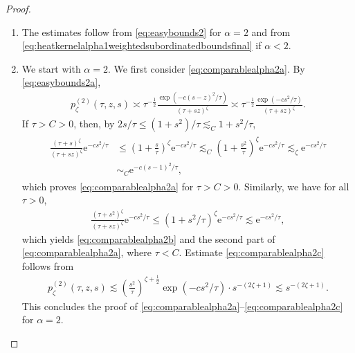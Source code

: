 \documentclass[12pt,reqno,a4paper]{amsart}
\theoremstyle{definition}
\theoremstyle{remark}
\numberwithin{equation}{section}
\newcommand{\1}{\mathbbm{1}}
\newcommand{\me}[1]{\mathrm{e}^{#1}}
\begin{document}
\begin{proof}
  \begin{enumerate}
  \item The estimates follow from \eqref{eq:easybounds2} for $\alpha=2$ and from \eqref{eq:heatkernelalpha1weightedsubordinatedboundsfinal} if $\alpha<2$.
    
    \smallskip
  \item We start with $\alpha=2$. We first consider \eqref{eq:comparablealpha2a}. By \eqref{eq:easybounds2a},
    \begin{align}
      p_\zeta^{(2)}(\tau,z,s)
      \asymp \tau^{-\frac12}\frac{\exp(-c(s-z)^2/\tau)}{(\tau+sz)^\zeta}
      \asymp \tau^{-\frac12}\frac{\exp(-cs^2/\tau)}{(\tau+sz)^\zeta}.
    \end{align}
    If $\tau>C>0$, then, by $2s/\tau\leq(1+s^2)/\tau\lesssim_C 1+s^2/\tau$,
    \begin{align}
      \begin{split}
        \frac{(\tau+s)^\zeta}{(\tau+sz)^\zeta}\me{-cs^2/\tau}
        & \leq \left(1+\frac s\tau\right)^\zeta \me{-cs^2/\tau}
          \lesssim_C \left(1+\frac{s^2}{\tau}\right)^\zeta \me{-cs^2/\tau}
          \lesssim_\zeta \me{-cs^2/\tau} \\
        & \sim_C \me{-c(s-1)^2/\tau},
      \end{split}
    \end{align}
    which proves \eqref{eq:comparablealpha2a} for $\tau>C>0$.
    Similarly, we have for all $\tau>0$,
    \begin{align}
      \frac{(\tau+s^2)^\zeta}{(\tau+sz)^\zeta}\me{-cs^2/\tau}
      \leq (1+s^2/\tau)^\zeta \me{-cs^2/\tau}
      \lesssim \me{-cs^2/\tau},
    \end{align}
    which yields \eqref{eq:comparablealpha2b} and the second part of \eqref{eq:comparablealpha2a}, where $\tau<C$.
    Estimate \eqref{eq:comparablealpha2c} follows from
    \begin{align}
      p_\zeta^{(2)}(\tau,z,s)
      \lesssim \left(\frac{s^2}{\tau}\right)^{\zeta+\frac12} \exp(-cs^2/\tau) \cdot s^{-(2\zeta+1)}
      \lesssim s^{-(2\zeta+1)}.
    \end{align}
    This concludes the proof of \eqref{eq:comparablealpha2a}--\eqref{eq:comparablealpha2c} for $\alpha=2$.
    

\end{enumerate}
\end{proof}
\end{document}
